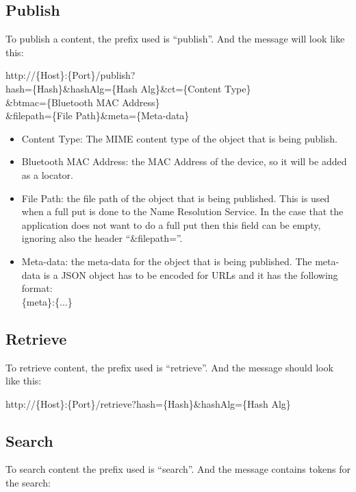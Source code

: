 \documentclass[10pt,a4paper]{article}
\begin{document}
\subsection{Publish}
To publish a content, the prefix used is ``publish''. And the message will look like this:\\

\begin{center}
http://\{Host\}:\{Port\}/publish?\\
hash=\{Hash\}\&hashAlg=\{Hash Alg\}\&ct=\{Content Type\}\\
\&btmac=\{Bluetooth MAC Address\}\\
\&filepath=\{File Path\}\&meta=\{Meta-data\}\\
\end{center}

\begin{itemize}
 \item Content Type: The MIME content type of the object that is being publish.
 \item Bluetooth MAC Address: the MAC Address of the device, so it will be added as a locator.
 \item File Path: the file path of the object that is being published. This is used when a full put is done to the Name Resolution Service. In the case that the application
 does not want to do a full put then this field can be empty, ignoring also the header ``\&filepath=''.
 \item Meta-data: the meta-data for the object that is being published. The meta-data is a JSON object has to be encoded for URLs and it has the following format:\\
  \{meta\}:\{...\}\\
 \end{itemize}

\subsection{Retrieve}
To retrieve content, the prefix used is ``retrieve''. And the message should look like this:\\

\begin{center}
http://\{Host\}:\{Port\}/retrieve?hash=\{Hash\}\&hashAlg=\{Hash Alg\}\\\end{center}


\subsection{Search}
To search content the prefix used is ``search''. And the message contains tokens for the search:\\
\end{document}
